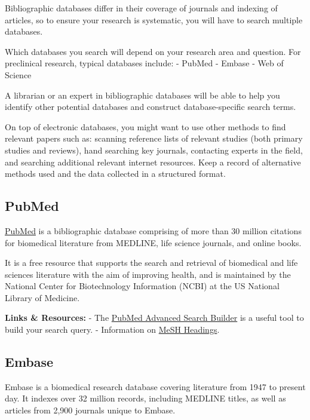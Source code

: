 \documentclass[
]{book}
\begin{document}
Bibliographic databases differ in their coverage of journals and indexing of articles, so to ensure your research is systematic, you will have to search multiple databases.

Which databases you search will depend on your research area and question. For preclinical research, typical databases include:
- PubMed
- Embase
- Web of Science

A librarian or an expert in bibliographic databases will be able to help you identify other potential databases and construct database-specific search terms.

On top of electronic databases, you might want to use other methods to find relevant papers such as: scanning reference lists of relevant studies (both primary studies and reviews), hand searching key journals, contacting experts in the field, and searching additional relevant internet resources. Keep a record of alternative methods used and the data collected in a structured format.

\hypertarget{pubmed}{%
\subsection{PubMed}\label{pubmed}}

\href{https://pubmed.ncbi.nlm.nih.gov/}{PubMed} is a bibliographic database comprising of more than 30 million citations for biomedical literature from MEDLINE, life science journals, and online books.

It is a free resource that supports the search and retrieval of biomedical and life sciences literature with the aim of improving health, and is maintained by the National Center for Biotechnology Information (NCBI) at the US National Library of Medicine.

\textbf{Links \& Resources:}
- The \href{https://www.ncbi.nlm.nih.gov/pubmed/advanced}{PubMed Advanced Search Builder} is a useful tool to build your search query.
- Information on \href{https://www.nlm.nih.gov/mesh/meshhome.html}{MeSH Headings}.

\hypertarget{embase}{%
\subsection{Embase}\label{embase}}

Embase is a biomedical research database covering literature from 1947 to present day. It indexes over 32 million records, including MEDLINE titles, as well as articles from 2,900 journals unique to Embase.
\end{document}
